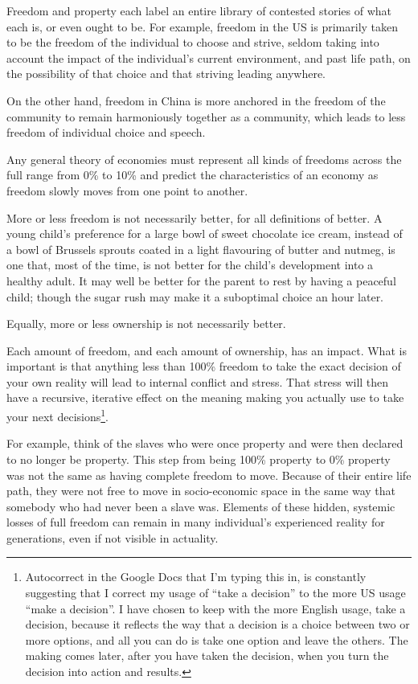 Freedom and property each label an entire library of contested stories of what each is, or even ought to be. For example, freedom in the US is primarily taken to be the freedom of the individual to choose and strive, seldom taking into account the impact of the individual's current environment, and past life path, on the possibility of that choice and that striving leading anywhere.


On the other hand, freedom in China is more anchored in the freedom of the community to remain harmoniously together as a community, which leads to less freedom of individual choice and speech.


Any general theory of economies  must represent all kinds of freedoms across the full range from 0\% to 10\% and predict the characteristics of an economy as freedom slowly moves from one point to another.


More or less freedom is not necessarily better, for all definitions of better. A young child's preference for a large bowl of sweet chocolate ice cream, instead of a bowl of Brussels sprouts coated in a light flavouring of butter and nutmeg, is one that, most of the time, is not better for the child's development into a healthy adult. It may well be better for the parent to rest by having a peaceful child; though the sugar rush may make it a suboptimal choice an hour later.


Equally, more or less ownership is not necessarily better.


Each amount of freedom, and each amount of ownership, has an impact. What is important is that anything less than 100\% freedom to take the exact decision of your own reality will lead to internal conflict and stress. That stress will then have a recursive, iterative effect on the meaning making you actually use to take your next decisions\footnote{Autocorrect in the Google Docs that I'm typing this in, is constantly suggesting that I correct my usage of “take a decision” to the more US usage “make a decision”. I have chosen to keep with the more English usage, take a decision, because it reflects the way that a decision is a choice between two or more options, and all you can do is take one option and leave the others. The making comes later, after you have taken the decision, when you turn the decision into action and results.}.


For example, think of the slaves who were once property and were then declared to no longer be property. This step from being 100\% property to 0\% property was not the same as having complete freedom to move. Because of their entire life path, they were not free to move in socio-economic space in the same way that somebody who had never been a slave was. Elements of these hidden, systemic losses of full freedom can remain in many individual’s experienced reality for generations, even if not visible in actuality.


